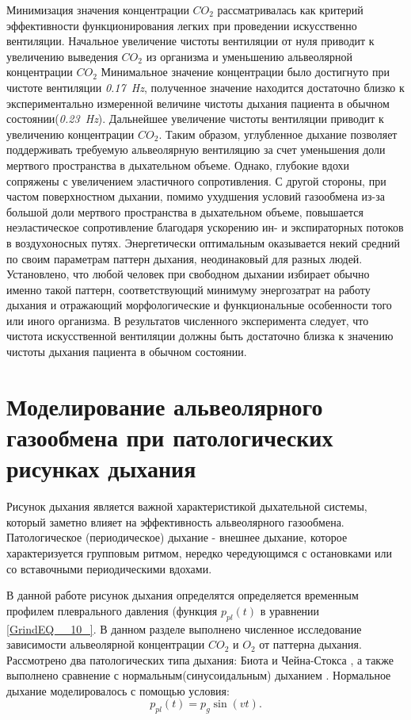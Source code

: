 Минимизация значения концентрации $CO_{2} $ рассматривалась как критерий эффективности функционирования легких при проведении искусственно вентиляции. Начальное увеличение чистоты вентиляции от нуля приводит к увеличению выведения $CO_{2} $ из организма и уменьшению альвеолярной концентрации $CO_{2} $  Минимальное значение концентрации было достигнуто при чистоте вентиляции \textit{0.17~Hz}, полученное значение находится достаточно близко к экспериментально измеренной величине чистоты дыхания пациента в обычном состоянии(\textit{0.23~Hz}). Дальнейшее увеличение чистоты вентиляции приводит к увеличению концентрации  $CO_{2} $. Таким образом, углубленное дыхание позволяет поддерживать требуемую альвеолярную вентиляцию за счет уменьшения доли мертвого пространства в дыхательном объеме. Однако, глубокие вдохи сопряжены с увеличением эластичного сопротивления. С другой стороны, при частом поверхностном дыхании, помимо ухудшения условий газообмена из-за большой доли мертвого пространства в дыхательном объеме, повышается неэластическое сопротивление благодаря ускорению ин- и экспираторных потоков в воздухоносных путях. Энергетически оптимальным оказывается некий средний по своим параметрам паттерн дыхания, неодинаковый для разных людей. Установлено, что любой человек при свободном дыхании избирает обычно именно такой паттерн, соответствующий минимуму энергозатрат на работу дыхания и отражающий морфологические и функциональные особенности того или иного организма. В результатов численного эксперимента следует, что чистота искусственной вентиляции должны быть достаточно близка к значению чистоты дыхания пациента в обычном состоянии.  

\section{Моделирование альвеолярного газообмена при патологических рисунках дыхания}
Рисунок дыхания является важной характеристикой дыхательной системы, который заметно влияет на эффективность альвеолярного газообмена. Патологическое (периодическое) дыхание -  внешнее дыхание, которое характеризуется групповым ритмом, нередко чередующимся с остановками или со вставочными периодическими вдохами. 

В данной работе рисунок дыхания определятся определяется временным профилем плеврального давления (функция $p_{pl} \left(t\right)$ в уравнении \eqref{GrindEQ__10_}. В данном разделе выполнено численное исследование зависимости альвеолярной концентрации $CO_{2} $ и $O_{2} $ от паттерна дыхания. Рассмотрено два патологических типа дыхания: Биота и Чейна-Стокса \cite{Wijdicks2007,Pearce2002}, а также выполнено сравнение с нормальным(синусоидальным) дыханием \cite{schmidt}. Нормальное дыхание моделировалось с помощью условия:
\begin{equation} \label{GrindEQ__40_} 
p_{pl} \left(t\right)=p_{g} \sin \left(vt\right).  
\end{equation}

